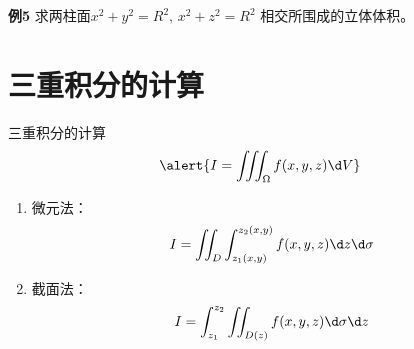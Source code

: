\begin{frame}
	\linespread{1.2}
			\begin{exampleblock}{{\bf 例5}\hfill}
			求两柱面$x^2+y^2=R^2,\, x^2+z^2=R^2$
			相交所围成的立体体积。
		\end{exampleblock}\pause 
			\begin{center}
		\end{center}
\end{frame}

\section{三重积分的计算}

\begin{frame}{三重积分的计算}
	\linespread{1.2}\pause 
	$$\alert{I=\iiint_{\Omega}f(x,y,z)\d V}$$
	\begin{enumerate}\pause 
	  \item {\bb 微元法：}
	  $$I=\iint_D\int_{z_1(x,y)}^{z_2(x,y)}f(x,y,z)\d z\d\sigma$$\pause 
	  \item {\bb 截面法：}
	  $$I=\int_{z_1}^{z_2}\iint_{D(z)}f(x,y,z)\d\sigma \d z$$
	\end{enumerate}
\end{frame}

